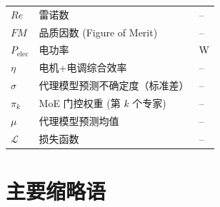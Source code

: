 \begin{tabular}{p{2.5cm}p{8cm}p{2.5cm}}
$Re$          & 雷诺数                              & --               \\
$FM$          & 品质因数 (Figure of Merit)           & --               \\
$P_\text{elec}$ & 电功率                            & W                \\
$\eta$        & 电机+电调综合效率                    & --               \\
$\sigma$      & 代理模型预测不确定度（标准差）         & --               \\
$\pi_k$       & MoE 门控权重 (第 $k$ 个专家)         & --               \\
$\mu$         & 代理模型预测均值                    & --               \\
$\mathcal{L}$ & 损失函数                            & --               \\
\bottomrule
\end{tabular}

\section*{主要缩略语}

